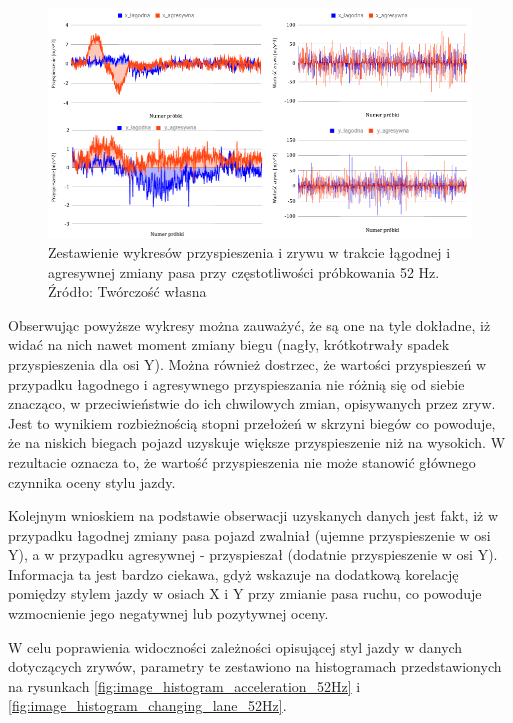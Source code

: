 \begin{figure}[H]
	\centering
	\includegraphics[width=16cm]{img/driving_analysis/zestawienie_ostra_lagodna.png}
	\caption{Zestawienie wykresów przyspieszenia i zrywu w trakcie łągodnej i agresywnej zmiany pasa przy częstotliwości próbkowania 52 Hz.
	\\Źródło: Twórczość własna}
	\label{fig:image_driving_analysis_test_acc_light_hard_lane_52Hz}
\end{figure}

Obserwując powyższe wykresy można zauważyć, że są one na tyle dokładne, iż widać na nich nawet moment zmiany biegu (nagły, krótkotrwały spadek przyspieszenia dla osi Y). Można również dostrzec, że wartości przyspieszeń w przypadku łagodnego i agresywnego przyspieszania nie różnią się od siebie znacząco, w przeciwieństwie do ich chwilowych zmian, opisywanych przez zryw. Jest to wynikiem rozbieżnością stopni przełożeń w skrzyni biegów co powoduje, że na niskich biegach pojazd uzyskuje większe przyspieszenie niż na wysokich. W rezultacie oznacza to, że wartość przyspieszenia nie może stanowić głównego czynnika oceny stylu jazdy.

Kolejnym wnioskiem na podstawie obserwacji uzyskanych danych jest fakt, iż w przypadku łagodnej zmiany pasa pojazd zwalniał (ujemne przyspieszenie w osi Y), a w przypadku agresywnej - przyspieszał (dodatnie przyspieszenie w osi Y). Informacja ta jest bardzo ciekawa, gdyż wskazuje na dodatkową korelację pomiędzy stylem jazdy w osiach X i Y przy zmianie pasa ruchu, co powoduje wzmocnienie jego negatywnej lub pozytywnej oceny.

W celu poprawienia widoczności zależności opisującej styl jazdy w danych dotyczących zrywów, parametry te zestawiono na histogramach przedstawionych na rysunkach \ref{fig:image_histogram_acceleration_52Hz} i \ref{fig:image_histogram_changing_lane_52Hz}.

